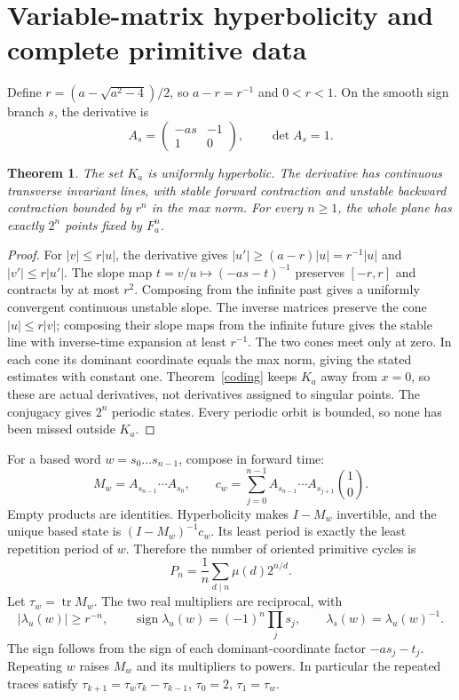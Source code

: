 \documentclass[10pt]{article}
\newtheorem{theorem}{Theorem}
\newcommand{\tr}{\operatorname{tr}}
\begin{document}
\section{Variable-matrix hyperbolicity and complete primitive data}
Define $r=(a-\sqrt{a^2-4})/2$, so $a-r=r^{-1}$ and $0<r<1$.
On the smooth sign branch $s$, the derivative is
\[
 A_s=\begin{pmatrix}-as&-1\\1&0\end{pmatrix},\qquad \det A_s=1.
\]
\begin{theorem}\label{hyperbolic}
The set $K_a$ is uniformly hyperbolic. The derivative has continuous
transverse invariant lines, with stable forward contraction and unstable
backward contraction bounded by $r^n$ in the max norm.
For every $n\ge1$, the whole plane has exactly $2^n$ points fixed by $F_a^n$.
\end{theorem}
\begin{proof}
For $|v|\le r|u|$, the derivative gives
$|u'|\ge(a-r)|u|=r^{-1}|u|$ and $|v'|\le r|u'|$.
The slope map $t=v/u\mapsto(-as-t)^{-1}$ preserves $[-r,r]$ and
contracts by at most $r^2$. Composing from the infinite past gives a
uniformly convergent continuous unstable slope. The inverse matrices
preserve the cone $|u|\le r|v|$; composing their slope maps from the infinite
future gives the stable line with inverse-time expansion at least $r^{-1}$.
The two cones meet only at zero. In each cone its dominant coordinate
equals the max norm, giving the stated estimates with constant one.
Theorem~\ref{coding} keeps $K_a$ away from $x=0$, so these are actual
derivatives, not derivatives assigned to singular points.
The conjugacy gives $2^n$ periodic states. Every periodic orbit is bounded,
so none has been missed outside $K_a$.
\end{proof}

For a based word $w=s_0\ldots s_{n-1}$, compose in forward time:
\[
 M_w=A_{s_{n-1}}\cdots A_{s_0},\qquad
 c_w=\sum_{j=0}^{n-1}A_{s_{n-1}}\cdots A_{s_{j+1}}\binom10.
\]
Empty products are identities. Hyperbolicity makes $I-M_w$ invertible,
and the unique based state is $(I-M_w)^{-1}c_w$.
Its least period is exactly the least repetition period of $w$.
Therefore the number of oriented primitive cycles is
\[
 P_n=\frac1n\sum_{d\mid n}\mu(d)2^{n/d}.
\]
Let $\tau_w=\tr M_w$. The two real multipliers are reciprocal, with
\begin{equation}\label{multiplier}
 |\lambda_u(w)|\ge r^{-n},\qquad
 \operatorname{sign}\lambda_u(w)=(-1)^n\prod_j s_j,\qquad
 \lambda_s(w)=\lambda_u(w)^{-1}.
\end{equation}
The sign follows from the sign of each dominant-coordinate factor
$-as_j-t_j$. Repeating $w$ raises $M_w$ and its multipliers to powers.
In particular the repeated traces satisfy
$\tau_{k+1}=\tau_w\tau_k-\tau_{k-1}$, $\tau_0=2$, $\tau_1=\tau_w$.
\end{document}
